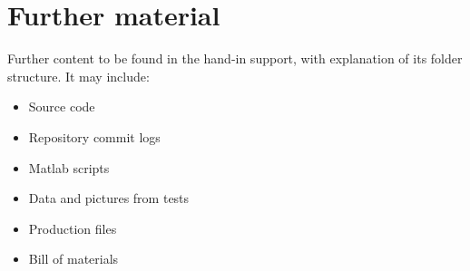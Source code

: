 \chapter{Further material}

Further content to be found in the hand-in support, with explanation of its folder structure.
It may include:

\begin{itemize}
\item Source code
\item Repository commit logs
\item Matlab scripts
\item Data and pictures from tests
\item Production files
\item Bill of materials
\end{itemize}